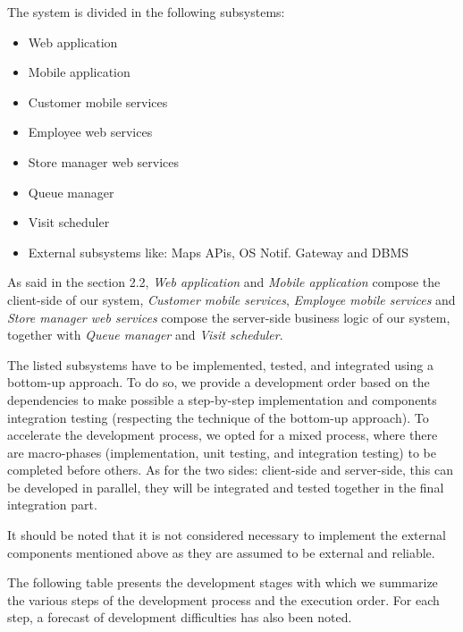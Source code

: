 The system is divided in the following subsystems:
\begin{itemize}
    \item Web application
    \item Mobile application
    \item Customer mobile services
    \item Employee web services
    \item Store manager web services
    \item Queue manager
    \item Visit scheduler
    \item External subsystems like: Maps APis, OS Notif. Gateway and DBMS
\end{itemize}
As said in the section 2.2, \textit{Web application} and \textit{Mobile application} compose the client-side of our system, \textit{Customer mobile services}, \textit{Employee mobile services} and \textit{Store manager web services} compose the server-side business logic of our system, together with \textit{Queue manager} and \textit{Visit scheduler}. 

The listed subsystems have to be implemented, tested, and integrated using a bottom-up approach. To do so, we provide a development order based on the dependencies to make possible a step-by-step implementation and components integration testing (respecting the technique of the bottom-up approach). To accelerate the development process, we opted for a mixed process, where there are macro-phases (implementation, unit testing, and integration testing) to be completed before others. As for the two sides: client-side and server-side, this can be developed in parallel, they will be integrated and tested together in the final integration part.

It should be noted that it is not considered necessary to implement the external components mentioned above as they are assumed to be external and reliable.

The following table presents the development stages with which we summarize the various steps of the development process and the execution order. For each step, a forecast of development difficulties has also been noted.

